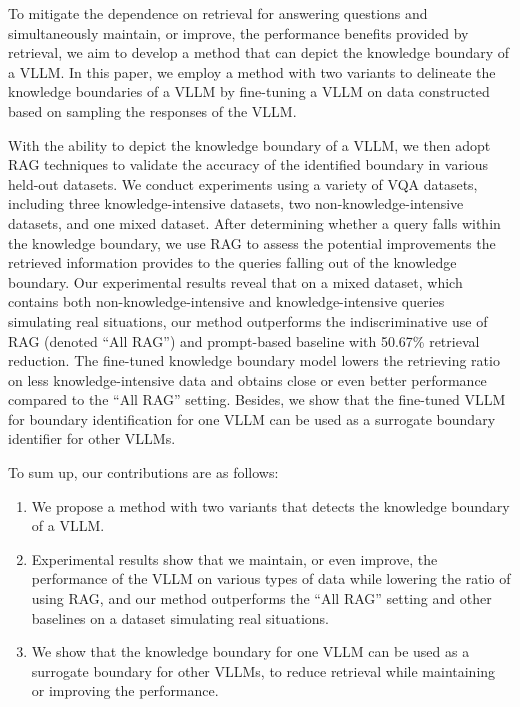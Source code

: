 To mitigate the dependence on retrieval for answering questions and simultaneously maintain, or improve, the performance benefits provided by retrieval, we aim to develop a method that can depict the knowledge boundary of a VLLM. 
In this paper, we employ a method with two variants to delineate the knowledge boundaries of a VLLM by fine-tuning a VLLM on data constructed based on sampling the responses of the VLLM. 


With the ability to depict the knowledge boundary of a VLLM, we then adopt RAG techniques to validate the accuracy of the identified boundary in various held-out datasets. 
We conduct experiments using a variety of VQA datasets, including three knowledge-intensive datasets, two non-knowledge-intensive datasets, and one mixed dataset. After determining whether a query falls within the knowledge boundary, we use RAG to assess the potential improvements the retrieved information provides to the queries falling out of the knowledge boundary. Our experimental results reveal that on a mixed dataset, which contains both non-knowledge-intensive and knowledge-intensive queries simulating real situations, our method outperforms the indiscriminative use of RAG (denoted ``All RAG'') and prompt-based baseline with 50.67\% retrieval reduction. The fine-tuned knowledge boundary model lowers the retrieving ratio on less knowledge-intensive data and obtains close or even better performance compared to the ``All RAG'' setting. 
Besides, we show that the fine-tuned VLLM for boundary identification for one VLLM can be used as a surrogate boundary identifier for other VLLMs.

To sum up, our contributions are as follows:
\begin{enumerate}[leftmargin=*,noitemsep, topsep=1pt]
    \item We propose a method with two variants that detects the knowledge boundary of a VLLM.
    \item Experimental results show that we maintain, or even improve, the performance of the VLLM on various types of data while lowering the ratio of using RAG, and our method outperforms the ``All RAG'' setting and other baselines on a dataset simulating real situations.
    \item We show that the knowledge boundary for one VLLM can be used as a surrogate boundary for other VLLMs, to reduce retrieval while maintaining or improving the performance.
\end{enumerate}


